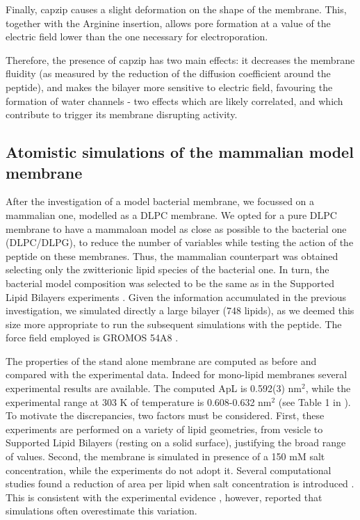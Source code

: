Finally, capzip causes a slight deformation on the shape of the membrane. This, together with the Arginine insertion, allows pore formation at a value of the electric field lower than the one necessary for electroporation.

Therefore, the presence of capzip has two main effects: it decreases the membrane fluidity (as measured by the reduction of the diffusion coefficient around the peptide), and makes the bilayer more sensitive to electric field, favouring the formation of water channels - two effects which are likely correlated, and which contribute to trigger its membrane disrupting activity.


\subsection{Atomistic simulations of the mammalian model membrane} \label{sec:lip_atom_mamm}

After the investigation of a model bacterial membrane, we focussed on a mammalian one, modelled as a DLPC membrane. We opted for a pure DLPC membrane to have a mammaloan model as close as possible to the bacterial one (DLPC/DLPG), to reduce the number of variables while testing the action of the peptide on these membranes. Thus, the mammalian counterpart was obtained selecting only the zwitterionic lipid species of the bacterial one. In turn, the bacterial model composition was selected to be the same as in the Supported Lipid Bilayers experiments \citep{Castelletto2016}.
%
Given the information accumulated in the previous investigation, we simulated directly a large bilayer (748 lipids), as we deemed this size more appropriate to run the subsequent simulations with the peptide. The force field employed is GROMOS 54A8 \citep{Reif2012}.

The properties of the stand alone membrane are computed as before and compared with the experimental data. Indeed for mono-lipid membranes several experimental results are available. The computed ApL is 0.592(3) nm$^2$, while the experimental range at 303 K of temperature is 0.608-0.632 nm$^2$ (see Table 1 in \citet{Poger2016}). To motivate the discrepancies, two factors must be considered. First, these experiments are performed on a variety of lipid geometries, from vesicle to Supported Lipid Bilayers (resting on a solid surface), justifying the broad range of values. Second, the membrane is simulated in presence of a 150 mM salt concentration, while the experiments do not adopt it. Several computational studies found a reduction of area per lipid when salt concentration is introduced \citep{Bockmann2003,Jarerattanachat2013,Reif2017}. This is consistent with the experimental evidence \citep{Pabst2007}, however, \citet{Reif2017} reported that simulations often overestimate this variation.

